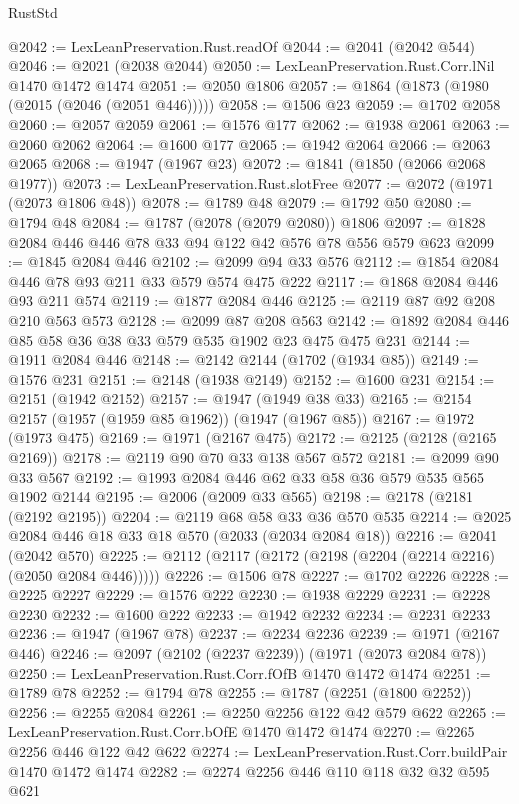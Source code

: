 \begin{lexlean}{RustStd}
\begin{coremodule}
{\begin{coremodule}
{{{{{{{{{{{{{@2042 := LexLeanPreservation.Rust.readOf
@2044 := @2041 (@2042 @544)
@2046 := @2021 (@2038 @2044)
@2050 := LexLeanPreservation.Rust.Corr.lNil @1470 @1472 @1474
@2051 := @2050 @1806
@2057 := @1864 (@1873 (@1980 (@2015 (@2046 (@2051 @446)))))
@2058 := @1506 @23
@2059 := @1702 @2058
@2060 := @2057 @2059
@2061 := @1576 @177
@2062 := @1938 @2061
@2063 := @2060 @2062
@2064 := @1600 @177
@2065 := @1942 @2064
@2066 := @2063 @2065
@2068 := @1947 (@1967 @23)
@2072 := @1841 (@1850 (@2066 @2068 @1977))
@2073 := LexLeanPreservation.Rust.slotFree
@2077 := @2072 (@1971 (@2073 @1806 @48))
@2078 := @1789 @48
@2079 := @1792 @50
@2080 := @1794 @48
@2084 := @1787 (@2078 (@2079 @2080)) @1806
@2097 := @1828 @2084 @446 @446 @78 @33 @94 @122 @42 @576 @78 @556 @579 @623
@2099 := @1845 @2084 @446
@2102 := @2099 @94 @33 @576
@2112 := @1854 @2084 @446 @78 @93 @211 @33 @579 @574 @475 @222
@2117 := @1868 @2084 @446 @93 @211 @574
@2119 := @1877 @2084 @446
@2125 := @2119 @87 @92 @208 @210 @563 @573
@2128 := @2099 @87 @208 @563
@2142 := @1892 @2084 @446 @85 @58 @36 @38 @33 @579 @535 @1902 @23 @475 @475 @231
@2144 := @1911 @2084 @446
@2148 := @2142 @2144 (@1702 (@1934 @85))
@2149 := @1576 @231
@2151 := @2148 (@1938 @2149)
@2152 := @1600 @231
@2154 := @2151 (@1942 @2152)
@2157 := @1947 (@1949 @38 @33)
@2165 := @2154 @2157 (@1957 (@1959 @85 @1962)) (@1947 (@1967 @85))
@2167 := @1972 (@1973 @475)
@2169 := @1971 (@2167 @475)
@2172 := @2125 (@2128 (@2165 @2169))
@2178 := @2119 @90 @70 @33 @138 @567 @572
@2181 := @2099 @90 @33 @567
@2192 := @1993 @2084 @446 @62 @33 @58 @36 @579 @535 @565 @1902 @2144
@2195 := @2006 (@2009 @33 @565)
@2198 := @2178 (@2181 (@2192 @2195))
@2204 := @2119 @68 @58 @33 @36 @570 @535
@2214 := @2025 @2084 @446 @18 @33 @18 @570 (@2033 (@2034 @2084 @18))
@2216 := @2041 (@2042 @570)
@2225 := @2112 (@2117 (@2172 (@2198 (@2204 (@2214 @2216) (@2050 @2084 @446)))))
@2226 := @1506 @78
@2227 := @1702 @2226
@2228 := @2225 @2227
@2229 := @1576 @222
@2230 := @1938 @2229
@2231 := @2228 @2230
@2232 := @1600 @222
@2233 := @1942 @2232
@2234 := @2231 @2233
@2236 := @1947 (@1967 @78)
@2237 := @2234 @2236
@2239 := @1971 (@2167 @446)
@2246 := @2097 (@2102 (@2237 @2239)) (@1971 (@2073 @2084 @78))
@2250 := LexLeanPreservation.Rust.Corr.fOfB @1470 @1472 @1474
@2251 := @1789 @78
@2252 := @1794 @78
@2255 := @1787 (@2251 (@1800 @2252))
@2256 := @2255 @2084
@2261 := @2250 @2256 @122 @42 @579 @622
@2265 := LexLeanPreservation.Rust.Corr.bOfE @1470 @1472 @1474
@2270 := @2265 @2256 @446 @122 @42 @622
@2274 := LexLeanPreservation.Rust.Corr.buildPair @1470 @1472 @1474
@2282 := @2274 @2256 @446 @110 @118 @32 @32 @595 @621
}}}}}}}}}}}}}
\end{coremodule}}
\end{coremodule}
\end{lexlean}
